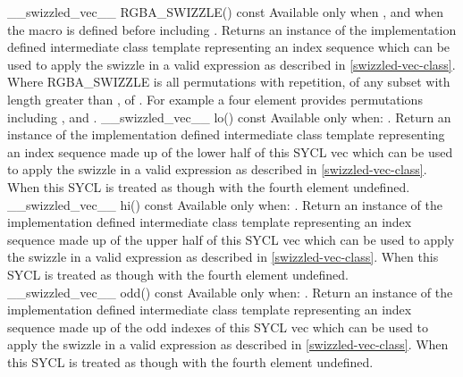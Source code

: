   \addRow
    {\__swizzled_vec__ RGBA_SWIZZLE() const}
    {
      Available only when , and when the macro  is defined before including .
      \newline \newline
      Returns an instance of the implementation defined intermediate class template  representing an index sequence which can be used to apply the swizzle in a valid expression as described in \ref{swizzled-vec-class}.
    \newline \newline
    Where RGBA\_SWIZZLE is all permutations with repetition, of any subset with length greater than , of .
    For example a four element  provides permutations including ,  and .
    }
  \addRow
    {\__swizzled_vec__ lo() const}
    {
      Available only when: .
      Return an instance of the implementation defined intermediate class template  representing an index sequence made up of the lower half of this SYCL vec which can be used to apply the swizzle in a valid expression as described in \ref{swizzled-vec-class}. When  this SYCL  is treated as though  with the fourth element undefined.
    }
  \addRow
    {\__swizzled_vec__ hi() const}
    {
      Available only when: .
      Return an instance of the implementation defined intermediate class template  representing an index sequence made up of the upper half of this SYCL vec which can be used to apply the swizzle in a valid expression as described in \ref{swizzled-vec-class}. When  this SYCL  is treated as though  with the fourth element undefined.
    }
  \addRow
    {\__swizzled_vec__ odd() const}
    {
      Available only when: .
      Return an instance of the implementation defined intermediate class template  representing an index sequence made up of the odd indexes of this SYCL vec which can be used to apply the swizzle in a valid expression as described in \ref{swizzled-vec-class}. When  this SYCL  is treated as though  with the fourth element undefined.
    }    
